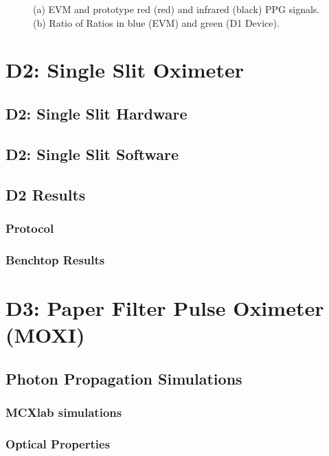     \begin{figure}
        \begin{center}
        \end{center}
        \caption{(a) EVM and prototype red (red) and infrared (black) PPG signals. (b) Ratio of Ratios in blue (EVM) and green (D1 Device).} 
        \label{fig:xx}
    \end{figure}



\section{D2: Single Slit Oximeter}
    \subsection{D2: Single Slit Hardware}
    \subsection{D2: Single Slit Software}
    \subsection{D2 Results}
        \subsubsection{Protocol}
        \subsubsection{Benchtop Results}



\section{D3: Paper Filter Pulse Oximeter (MOXI)}
    \subsection{Photon Propagation Simulations}
        \subsubsection{MCXlab simulations}
        \subsubsection{Optical Properties}
